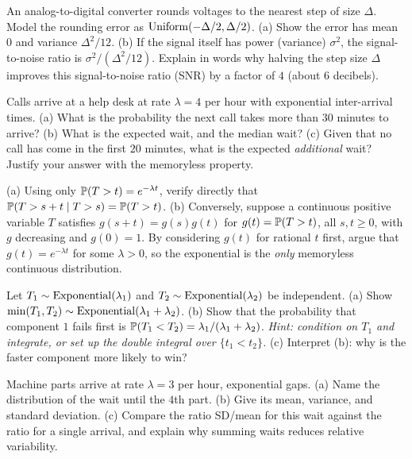 \begin{exercise}
\label{ch11:exr-quant}
An analog-to-digital converter rounds voltages to the nearest step of size
$\Delta$. Model the rounding error as $\Unif(-\Delta/2,\Delta/2)$. (a) Show the
error has mean $0$ and variance $\Delta^2/12$. (b) If the signal itself has power
(variance) $\sigma^2$, the signal-to-noise ratio is $\sigma^2/(\Delta^2/12)$.
Explain in words why halving the step size $\Delta$ improves this signal-to-noise ratio (SNR) by a factor
of $4$ (about $6$ decibels).
\end{exercise}

\begin{exercise}
\label{ch11:exr-expo}
Calls arrive at a help desk at rate $\lambda = 4$ per hour with exponential
inter-arrival times. (a) What is the probability the next call takes more than
$30$ minutes to arrive? (b) What is the expected wait, and the median wait?
(c) Given that no call has come in the first $20$ minutes, what is the expected
\emph{additional} wait? Justify your answer with the memoryless property.
\end{exercise}

\begin{exercise}
\label{ch11:exr-memoryless}
(a) Using only $\P(T>t)=e^{-\lambda t}$, verify directly that
$\P(T > s+t \given T > s) = \P(T>t)$. (b) Conversely, suppose a continuous
positive variable $T$ satisfies $g(s+t)=g(s)g(t)$ for $g(t)=\P(T>t)$, all
$s,t\ge0$, with $g$ decreasing and $g(0)=1$. By considering $g(t)$ for rational
$t$ first, argue that $g(t)=e^{-\lambda t}$ for some $\lambda>0$, so the
exponential is the \emph{only} memoryless continuous distribution.
\end{exercise}

\begin{exercise}
\label{ch11:exr-min}
Let $T_1\sim\Expo(\lambda_1)$ and $T_2\sim\Expo(\lambda_2)$ be independent.
(a) Show $\min(T_1,T_2)\sim\Expo(\lambda_1+\lambda_2)$. (b) Show that the
probability that component $1$ fails first is
$\P(T_1 < T_2) = \lambda_1/(\lambda_1+\lambda_2)$. \emph{Hint: condition on
$T_1$ and integrate, or set up the double integral over $\{t_1<t_2\}$.}
(c) Interpret (b): why is the faster component more likely to win?
\end{exercise}

\begin{exercise}
\label{ch11:exr-gamma}
Machine parts arrive at rate $\lambda=3$ per hour, exponential gaps. (a) Name
the distribution of the wait until the $4$th part. (b) Give its mean, variance,
and standard deviation. (c) Compare the ratio SD/mean for this wait against the
ratio for a single arrival, and explain why summing waits reduces relative
variability.
\end{exercise}

